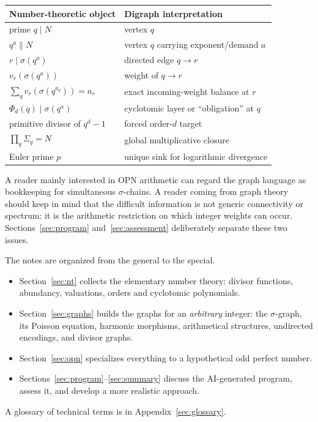 \documentclass[11pt]{article}
\theoremstyle{definition}
\theoremstyle{remark}
\begin{document}
\begin{center}
\begin{tabular}{@{}ll@{}}
\toprule
\textbf{Number-theoretic object} & \textbf{Digraph interpretation}\\
\midrule
prime $q\mid N$ & vertex $q$\\
$q^a\parallel N$ & vertex $q$ carrying exponent/demand $a$\\
$r\mid\sigma(q^a)$ & directed edge $q\to r$\\
$v_r(\sigma(q^a))$ & weight of $q\to r$\\
$\sum_q v_r(\sigma(q^{a_q}))=a_r$ & exact incoming-weight balance at $r$\\
$\Phi_d(q)\mid\sigma(q^a)$ & cyclotomic layer or ``obligation'' at $q$\\
primitive divisor of $q^d-1$ & forced order-$d$ target\\
$\prod_q\Sigma_q=N$ & global multiplicative closure\\
Euler prime $p$ & unique sink for logarithmic divergence\\
\bottomrule
\end{tabular}
\end{center}

A reader mainly interested in OPN arithmetic can regard the graph language as
bookkeeping for simultaneous $\sigma$-chains.  A reader coming from graph
theory should keep in mind that the difficult information is not generic
connectivity or spectrum: it is the arithmetic restriction on which integer
weights can occur.  Sections~\ref{sec:program} and~\ref{sec:assessment}
deliberately separate these two issues.

The notes are organized from the general to the special.
\begin{itemize}[leftmargin=1.5em]
\item Section~\ref{sec:nt} collects the elementary number theory: divisor
  functions, abundancy, valuations, orders and cyclotomic polynomials.
\item Section~\ref{sec:graphs} builds the graphs for an \emph{arbitrary}
  integer: the $\sigma$-graph, its Poisson equation, harmonic morphisms,
  arithmetical structures, undirected encodings, and divisor graphs.
\item Section~\ref{sec:opn} specializes everything to a hypothetical odd
  perfect number.
\item Sections~\ref{sec:program}--\ref{sec:summary} discuss the
  AI-generated program, assess it, and develop a more realistic approach.
\end{itemize}
A glossary of technical terms is in Appendix~\ref{sec:glossary}.
\end{document}
